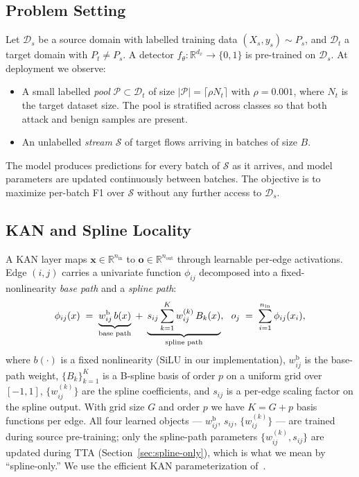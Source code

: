 \documentclass[10pt, conference, letterpaper]{IEEEtran}
\begin{document}
\subsection{Problem Setting}
\label{sec:problem}

Let $\mathcal{D}_s$ be a source domain with labelled training data $(X_s, y_s) \sim P_s$, and $\mathcal{D}_t$ a target domain with $P_t \neq P_s$. A detector $f_\theta : \mathbb{R}^{d_x} \to \{0,1\}$ is pre-trained on $\mathcal{D}_s$. At deployment we observe:
\begin{itemize}
    \item A small labelled \emph{pool} $\mathcal{P} \subset \mathcal{D}_t$ of size $|\mathcal{P}| = \lceil \rho N_t \rceil$ with $\rho = 0.001$, where $N_t$ is the target dataset size. The pool is stratified across classes so that both attack and benign samples are present.
    \item An unlabelled \emph{stream} $\mathcal{S}$ of target flows arriving in batches of size $B$.
\end{itemize}
The model produces predictions for every batch of $\mathcal{S}$ as it arrives, and model parameters are updated continuously between batches. The objective is to maximize per-batch F1 over $\mathcal{S}$ without any further access to $\mathcal{D}_s$.

\subsection{KAN and Spline Locality}
\label{sec:kan}

A KAN layer maps $\mathbf{x} \in \mathbb{R}^{n_{\text{in}}}$ to $\mathbf{o} \in \mathbb{R}^{n_{\text{out}}}$ through learnable per-edge activations. Edge $(i,j)$ carries a univariate function $\phi_{ij}$ decomposed into a fixed-nonlinearity \emph{base path} and a \emph{spline path}:
\begin{equation}
\label{eq:kan-edge}
\phi_{ij}(x) \;=\; \underbrace{w^{\text{b}}_{ij}\, b(x)}_{\text{base path}} \;+\; \underbrace{s_{ij}\sum_{k=1}^{K} w_{ij}^{(k)}\, B_k(x)}_{\text{spline path}}, 
\hspace{1.5ex}
o_j \;=\; \sum_{i=1}^{n_{\text{in}}} \phi_{ij}(x_i),
\end{equation}
where $b(\cdot)$ is a fixed nonlinearity (SiLU in our implementation), $w^{\text{b}}_{ij}$ is the base-path weight, $\{B_k\}_{k=1}^{K}$ is a B-spline basis of order $p$ on a uniform grid over $[-1, 1]$, $\{w_{ij}^{(k)}\}$ are the spline coefficients, and $s_{ij}$ is a per-edge scaling factor on the spline output. With grid size $G$ and order $p$ we have $K = G + p$ basis functions per edge. All four learned objects --- $w^{\text{b}}_{ij}$, $s_{ij}$, $\{w_{ij}^{(k)}\}$ --- are trained during source pre-training; only the spline-path parameters $\{w_{ij}^{(k)}, s_{ij}\}$ are updated during TTA (Section~\ref{sec:spline-only}), which is what we mean by ``spline-only.'' We use the efficient KAN parameterization of~\cite{liu2024kan}.
\end{document}
